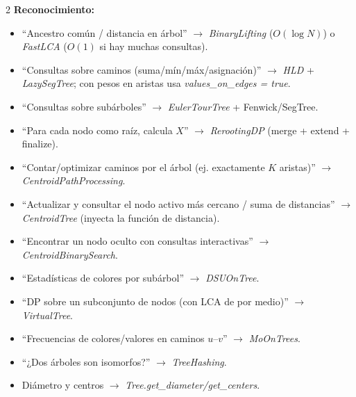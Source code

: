 \documentclass[10pt]{article}
\begin{document}
\begin{multicols}{2}
\textbf{Reconocimiento:}
\begin{itemize}\setlength{\itemsep}{1pt}
  \item ``Ancestro común / distancia en árbol'' $\to$ \textit{BinaryLifting} ($O(\log N)$) o \textit{FastLCA} ($O(1)$ si hay muchas consultas).
  \item ``Consultas sobre caminos (suma/mín/máx/asignación)'' $\to$ \textit{HLD} + \textit{LazySegTree}; con pesos en aristas usa \textit{values\_on\_edges = true}.
  \item ``Consultas sobre subárboles'' $\to$ \textit{EulerTourTree} + Fenwick/SegTree.
  \item ``Para cada nodo como raíz, calcula $X$'' $\to$ \textit{RerootingDP} (merge + extend + finalize).
  \item ``Contar/optimizar caminos por el árbol (ej. exactamente $K$ aristas)'' $\to$ \textit{CentroidPathProcessing}.
  \item ``Actualizar y consultar el nodo activo más cercano / suma de distancias'' $\to$ \textit{CentroidTree} (inyecta la función de distancia).
  \item ``Encontrar un nodo oculto con consultas interactivas'' $\to$ \textit{CentroidBinarySearch}.
  \item ``Estadísticas de colores por subárbol'' $\to$ \textit{DSUOnTree}.
  \item ``DP sobre un subconjunto de nodos (con LCA de por medio)'' $\to$ \textit{VirtualTree}.
  \item ``Frecuencias de colores/valores en caminos $u$--$v$'' $\to$ \textit{MoOnTrees}.
  \item ``¿Dos árboles son isomorfos?'' $\to$ \textit{TreeHashing}.
  \item Diámetro y centros $\to$ \textit{Tree.get\_diameter/get\_centers}.
\end{itemize}


\end{multicols}
\end{document}
